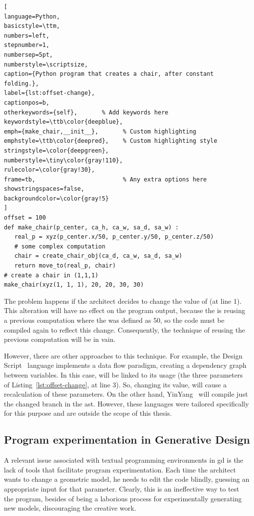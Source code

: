 \begin{lstlisting}[
language=Python,
basicstyle=\ttm,
numbers=left,
stepnumber=1,
numbersep=5pt,                   
numberstyle=\scriptsize, 
caption={Python program that creates a chair, after constant folding.},
label={lst:offset-change},
captionpos=b, 
otherkeywords={self},       % Add keywords here
keywordstyle=\ttb\color{deepblue},
emph={make_chair,__init__},       % Custom highlighting
emphstyle=\ttb\color{deepred},    % Custom highlighting style
stringstyle=\color{deepgreen},
numberstyle=\tiny\color{gray!110},
rulecolor=\color{gray!30},
frame=tb,                         % Any extra options here
showstringspaces=false,
backgroundcolor=\color{gray!5} 
]
offset = 100
def make_chair(p_center, ca_h, ca_w, sa_d, sa_w) :
   real_p = xyz(p_center.x/50, p_center.y/50, p_center.z/50)
   # some complex computation
   chair = create_chair_obj(ca_d, ca_w, sa_d, sa_w)
   return move_to(real_p, chair)
# create a chair in (1,1,1)
make_chair(xyz(1, 1, 1), 20, 20, 30, 30)
\end{lstlisting}

The problem happens if the architect decides to change the value of  (at line 1). This alteration will have no effect on the program output, because the  is reusing a previous computation where the  was defined as 50, so the code must be compiled again to reflect this change. Consequently, the technique of reusing the previous computation will be in vain.

However, there are other approaches to this technique. For example, the Design Script~\citep{aish2012designscript} language implements a data flow paradigm, creating a dependency graph between variables. In this case,  will be linked to its usage (the three parameters of Listing~\ref{lst:offset-change}, at line 3). So, changing its value, will cause a recalculation of these parameters.  On the other hand, YinYang~\citep{mcdirmid2013usable} will compile just the changed branch in the \gls{ast}. However, these languages were tailored specifically for this purpose and are outside the scope of this thesis.

\subsection{Program experimentation in Generative Design}

A relevant issue associated with textual programming environments in \gls{gd} is the lack of tools that facilitate program experimentation. Each time the architect wants to change a geometric model, he needs to edit the code blindly, guessing an appropriate input for that parameter. Clearly, this is an ineffective way to test the program, besides of being a laborious process for experimentally generating new models,  discouraging the creative work.

